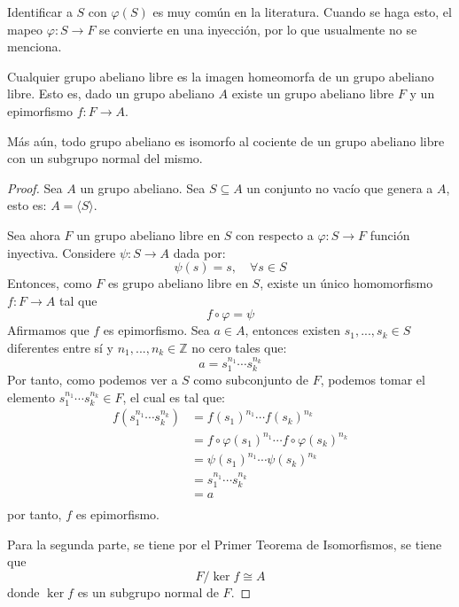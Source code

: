 \documentclass[12pt]{report}
\newcounter{it}
\theoremstyle{largebreak}
\newcommand\cf[3]{\ensuremath{#1:#2\rightarrow#3}}
\begin{document}
    Identificar a $S$ con $\varphi(S)$ es muy común en la literatura. Cuando se haga esto, el mapeo $\cf{\varphi}{S}{F}$ se convierte en una inyección, por lo que usualmente no se menciona.

    \begin{propo}
        Cualquier grupo abeliano libre es la imagen homeomorfa de un grupo abeliano libre. Esto es, dado un grupo abeliano $A$ existe un grupo abeliano libre $F$ y un epimorfismo $\cf{f}{F}{A}$.
        
        Más aún, todo grupo abeliano es isomorfo al cociente de un grupo abeliano libre con un subgrupo normal del mismo.
    \end{propo}

    \begin{proof}
        Sea $A$ un grupo abeliano. Sea $S\subseteq A$ un conjunto no vacío que genera a $A$, esto es: $A=\langle S\rangle$.

        Sea ahora $F$ un grupo abeliano libre en $S$ con respecto a $\cf{\varphi}{S}{F}$ función inyectiva. Considere $\cf{\psi}{S}{A}$ dada por:
        \begin{equation*}
            \psi(s)=s,\quad\forall s\in S
        \end{equation*}
        Entonces, como $F$ es grupo abeliano libre en $S$, existe un único homomorfismo $\cf{f}{F}{A}$ tal que
        \begin{equation*}
            f\circ\varphi=\psi
        \end{equation*}
        Afirmamos que $f$ es epimorfismo. Sea $a\in A$, entonces existen $s_1,...,s_k\in S$ diferentes entre sí y $n_1,...,n_k\in\mathbb{Z}$ no cero tales que:
        \begin{equation*}
            a=s_1^{n_1}\cdots s_k^{n_k}
        \end{equation*}
        Por tanto, como podemos ver a $S$ como subconjunto de $F$, podemos tomar el elemento $s_1^{n_1}\cdots s_k^{n_k}\in F$, el cual es tal que:
        \begin{equation*}
            \begin{split}
                f\left(s_1^{n_1}\cdots s_k^{n_k}\right)&=f(s_1)^{ n_1}\cdots f(s_k)^{ n_k}\\
                &=f\circ\varphi(s_1)^{ n_1}\cdots f\circ\varphi(s_k)^{ n_k}\\
                &=\psi(s_1)^{ n_1}\cdots\psi(s_k)^{ n_k}\\
                &=s_1^{n_1}\cdots s_k^{n_k}\\
                &=a\\
            \end{split}
        \end{equation*}
        por tanto, $f$ es epimorfismo.
        
        Para la segunda parte, se tiene por el Primer Teorema de Isomorfismos, se tiene que
        \begin{equation*}
            F/\ker f\cong A
        \end{equation*}
        donde $\ker f$ es un subgrupo normal de $F$.
    \end{proof}
\end{document}
